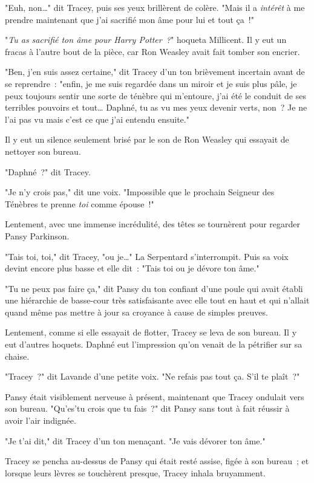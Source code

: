 "Euh, non…" dit Tracey, puis ses yeux brillèrent de colère. "Mais il a \emph{intérêt} à me prendre maintenant que j'ai sacrifié mon âme pour lui et tout ça~!"

"\emph{Tu as sacrifié ton âme pour Harry Potter~?}" hoqueta Millicent. Il y eut un fracas à l'autre bout de la pièce, car Ron Weasley avait fait tomber son encrier.

"Ben, j'en suis assez certaine," dit Tracey d'un ton brièvement incertain avant de se reprendre~: "enfin, je me suis regardée dans un miroir et je suis plus pâle, je peux toujours sentir une sorte de ténèbre qui m'entoure, j'ai été le conduit de ses terribles pouvoirs et tout… Daphné, tu as vu mes yeux devenir verts, non~? Je ne l'ai pas vu mais c'est ce que j'ai entendu ensuite."

Il y eut un silence seulement brisé par le son de Ron Weasley qui essayait de nettoyer son bureau.

"Daphné~?" dit Tracey.

"Je n'y crois pas," dit une voix. "Impossible que le prochain Seigneur des Ténèbres te prenne \emph{toi} comme épouse~!"

Lentement, avec une immense incrédulité, des têtes se tournèrent pour regarder Pansy Parkinson.

"Tais toi, toi," dit Tracey, "ou je…" La Serpentard s'interrompit. Puis sa voix devint encore plus basse et elle dit~: "Tais toi ou je dévore ton âme."

"Tu ne peux pas faire ça," dit Pansy du ton confiant d'une poule qui avait établi une hiérarchie de basse-cour très satisfaisante avec elle tout en haut et qui n'allait quand même pas mettre à jour sa croyance à cause de simples preuves.

Lentement, comme si elle essayait de flotter, Tracey se leva de son bureau. Il y eut d'autres hoquets. Daphné eut l'impression qu'on venait de la pétrifier sur sa chaise.

"Tracey~?" dit Lavande d'une petite voix. "Ne refais pas tout ça. S'il te plaît~?"

Pansy était visiblement nerveuse à présent, maintenant que Tracey ondulait vers son bureau. "Qu'es'tu crois que tu fais~?" dit Pansy sans tout à fait réussir à avoir l'air indignée.

"Je t'ai dit," dit Tracey d'un ton menaçant. "Je vais dévorer ton âme."

Tracey se pencha au-dessus de Pansy qui était resté assise, figée à son bureau~; et lorsque leurs lèvres se touchèrent presque, Tracey inhala bruyamment.

